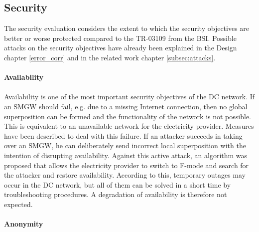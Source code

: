 \subsection{Security}
The security evaluation considers the extent to which the security objectives are better or worse protected compared to the \gls{TR-03109} from the \gls{BSI}. Possible attacks on the security objectives have already been explained in the Design chapter \ref{error_corr} and in the related work chapter \ref{subsec:attacks}.
\\
\\
\textbf{Availability}
\\
\\
Availability is one of the most important security objectives of the DC network. If an \gls{SMGW} should fail, e.g. due to a missing Internet connection, then no global superposition can be formed and the functionality of the network is not possible. This is equivalent to an unavailable network for the electricity provider. Measures have been described to deal with this failure. If an attacker succeeds in taking over an \gls{SMGW}, he can deliberately send incorrect local superposition with the intention of disrupting availability. Against this active attack, an algorithm was proposed that allows the electricity provider to switch to F-mode and search for the attacker and restore availability. According to this, temporary outages may occur in the DC network, but all of them can be solved in a short time by troubleshooting procedures. A degradation of availability is therefore not expected.
\\
\\
\textbf{Anonymity}
\\
\\

